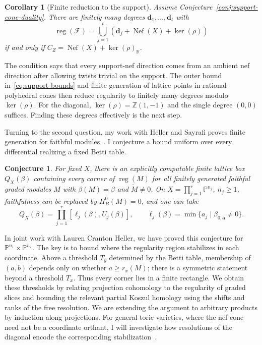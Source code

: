 \documentclass[11pt,reqno]{amsart}
\newtheorem{cor}[lemma]{Corollary}
\newtheorem{conjecture}[lemma]{Conjecture}
\theoremstyle{remark}
\newcommand{\reg}{\operatorname{reg}}
\newcommand{\Nef}{\operatorname{Nef}}
\renewcommand{\aa}{\mathbf{a}}
\newcommand{\dd}{\mathbf{d}}
\newcommand{\PP}{\mathbb{P}}
\newcommand{\RR}{\mathbb{R}}
\newcommand{\ZZ}{\mathbb{Z}}
\newcommand{\cF}{\mathcal{F}}
\begin{document}
\begin{cor}[Finite reduction to the support]\label{cor:support-reduction}
Assume Conjecture~\ref{conj:support-cone-duality}. There are finitely many degrees $\dd_1,\ldots,\dd_t$ with
\[
\reg(\cF)=\bigcup_{j=1}^t(\dd_j+\Nef(X)+\ker(\rho))
\]
if and only if $C_Z=\Nef(X)+\ker(\rho)_{\RR}$.
\end{cor}

The condition says that every support-nef direction comes from an ambient nef direction after allowing twists trivial on the support. The outer bound in~\eqref{eq:support-bounds} and finite generation of lattice points in rational polyhedral cones then reduce regularity to finitely many degrees modulo $\ker(\rho)$. For the diagonal, $\ker(\rho)=\ZZ(1,-1)$ and the single degree $(0,0)$ suffices. Finding these degrees effectively is the next step.

Turning to the second question, my work with Heller and Sayrafi proves finite generation for faithful modules~\cite{bruceHellerSayrafi22}. I conjecture a bound uniform over every differential realizing a fixed Betti table.

\begin{conjecture}\label{conj:betti-boxes}
For fixed $X$, there is an explicitly computable finite lattice box $Q_X(\beta)$ containing every corner of $\reg(M)$ for all finitely generated faithful graded modules $M$ with $\beta(M)=\beta$ and $\widetilde M\neq0$. On $X=\prod_{j=1}^r\PP^{n_j}$, $n_j\geq1$, faithfulness can be replaced by $H_B^0(M)=0$, and one can take
\[
Q_X(\beta)=\prod_{j=1}^r[\ell_j(\beta),U_j(\beta)],
\qquad \ell_j(\beta)=\min\{a_j\mid\beta_{0,\aa}\neq0\}.
\]
\end{conjecture}

In joint work with Lauren Cranton Heller, we have proved this conjecture for $\PP^{n_1}\times\PP^{n_2}$. The key is to bound where the regularity region stabilizes in each coordinate. Above a threshold $T_y$ determined by the Betti table, membership of $(a,b)$ depends only on whether $a\geq r_x(M)$; there is a symmetric statement beyond a threshold $T_x$. Thus every corner lies in a finite rectangle. We obtain these thresholds by relating projection cohomology to the regularity of graded slices and bounding the relevant partial Koszul homology using the shifts and ranks of the free resolution. We are extending the argument to arbitrary products by induction along projections. For general toric varieties, where the nef cone need not be a coordinate orthant, I will investigate how resolutions of the diagonal encode the corresponding stabilization~\cite{HHL24,brownSayrafi24}.
\end{document}
